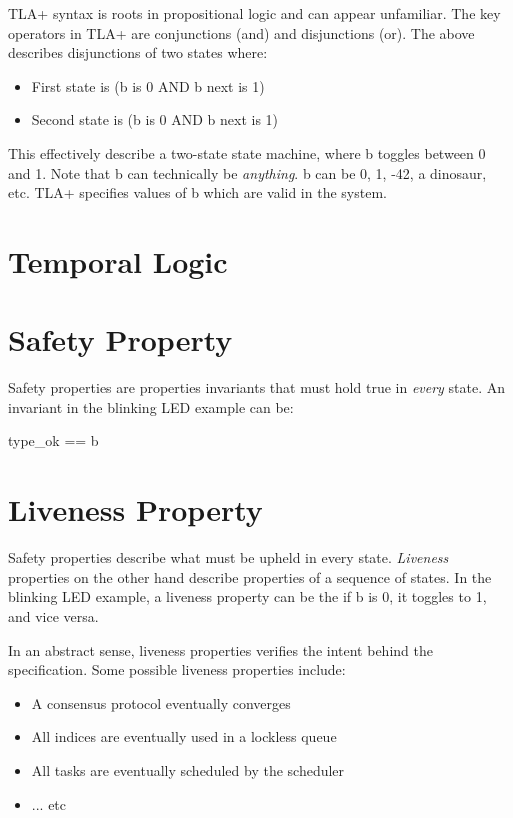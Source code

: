 \documentclass{report}
\begin{document}
TLA+ syntax is roots in propositional logic and can appear unfamiliar. The key
operators in TLA+ are conjunctions (and) and disjunctions (or). The above
describes disjunctions of two states where:
\begin{itemize}
    \item First state is (b is 0 AND b next is 1)
    \item Second state is (b is 0 AND b next is 1)
\end{itemize}
This effectively describe a two-state state machine, where b toggles between 0
and 1. Note that b can technically be \textit{anything}. b can be 0, 1, -42, a
dinosaur, etc. TLA+ specifies values of b which are valid in the system.

\section{Temporal Logic}

\section{Safety Property}

Safety properties are properties invariants that must hold true in
\textit{every} state. An invariant in the blinking LED example can be: 
\begin{tla}
    type_ok == b 
\end{tla}
\begin{tlatex}
%
\end{tlatex}

\section{Liveness Property}

Safety properties describe what must be upheld in every state. \textit{Liveness}
properties on the other hand describe properties of a sequence of states. In the
blinking LED example, a liveness property can be the if b is 0, it toggles to 1,
and vice versa.\newline

In an abstract sense, liveness properties verifies the intent behind the
specification.  Some possible liveness properties include: 
\begin{itemize}
    \item A consensus protocol eventually converges
    \item All indices are eventually used in a lockless queue
    \item All tasks are eventually scheduled by the scheduler
    \item ... etc
\end{itemize}
\end{document}
